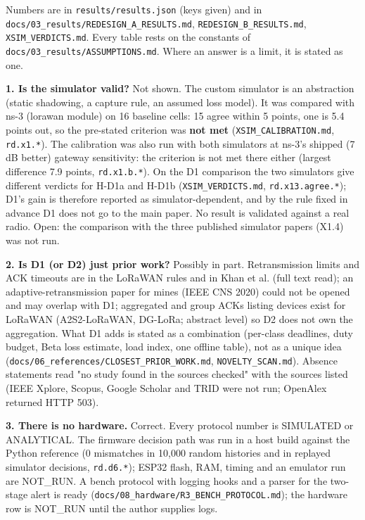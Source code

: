 


Numbers are in \texttt{results/results.json} (keys given) and in \texttt{docs/03\_results/REDESIGN\_A\_RESULTS.md}, \texttt{REDESIGN\_B\_RESULTS.md}, \texttt{XSIM\_VERDICTS.md}. Every table rests on the constants of \texttt{docs/03\_results/ASSUMPTIONS.md}. Where an answer is a limit, it is stated as one.

\textbf{1. Is the simulator valid?}
Not shown. The custom simulator is an abstraction (static shadowing, a capture rule, an assumed loss model). It was compared with ns-3 (lorawan module) on 16 baseline cells: 15 agree within 5 points, one is 5.4 points out, so the pre-stated criterion was \textbf{not met} (\texttt{XSIM\_CALIBRATION.md}, \texttt{rd.x1.*}). The calibration was also run with both simulators at ns-3's shipped (7 dB better) gateway sensitivity: the criterion is not met there either (largest difference 7.9 points, \texttt{rd.x1.b.*}). On the D1 comparison the two simulators give different verdicts for H-D1a and H-D1b (\texttt{XSIM\_VERDICTS.md}, \texttt{rd.x13.agree.*}); D1's gain is therefore reported as simulator-dependent, and by the rule fixed in advance D1 does not go to the main paper. No result is validated against a real radio. Open: the comparison with the three published simulator papers (X1.4) was not run.

\textbf{2. Is D1 (or D2) just prior work?}
Possibly in part. Retransmission limits and ACK timeouts are in the LoRaWAN rules and in Khan et al. (full text read); an adaptive-retransmission paper for mines (IEEE CNS 2020) could not be opened and may overlap with D1; aggregated and group ACKs listing devices exist for LoRaWAN (A2S2-LoRaWAN, DG-LoRa; abstract level) so D2 does not own the aggregation. What D1 adds is stated as a combination (per-class deadlines, duty budget, Beta loss estimate, load index, one offline table), not as a unique idea (\texttt{docs/06\_references/CLOSEST\_PRIOR\_WORK.md}, \texttt{NOVELTY\_SCAN.md}). Absence statements read "no study found in the sources checked" with the sources listed (IEEE Xplore, Scopus, Google Scholar and TRID were not run; OpenAlex returned HTTP 503).

\textbf{3. There is no hardware.}
Correct. Every protocol number is SIMULATED or ANALYTICAL. The firmware decision path was run in a host build against the Python reference (0 mismatches in 10,000 random histories and in replayed simulator decisions, \texttt{rd.d6.*}); ESP32 flash, RAM, timing and an emulator run are NOT\_RUN. A bench protocol with logging hooks and a parser for the two-stage alert is ready (\texttt{docs/08\_hardware/R3\_BENCH\_PROTOCOL.md}); the hardware row is NOT\_RUN until the author supplies logs.


